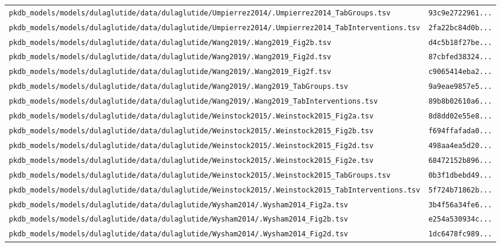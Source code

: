 \begin{longtable}{ll}
\texttt{pkdb\_models/models/dulaglutide/data/dulaglutide/Umpierrez2014/.Umpierrez2014\_TabGroups.tsv} & \texttt{93c9e2722961...} \\
\texttt{pkdb\_models/models/dulaglutide/data/dulaglutide/Umpierrez2014/.Umpierrez2014\_TabInterventions.tsv} & \texttt{2fa22bc84d0b...} \\
\texttt{pkdb\_models/models/dulaglutide/data/dulaglutide/Wang2019/.Wang2019\_Fig2b.tsv} & \texttt{d4c5b18f27be...} \\
\texttt{pkdb\_models/models/dulaglutide/data/dulaglutide/Wang2019/.Wang2019\_Fig2d.tsv} & \texttt{87cbfed38324...} \\
\texttt{pkdb\_models/models/dulaglutide/data/dulaglutide/Wang2019/.Wang2019\_Fig2f.tsv} & \texttt{c9065414eba2...} \\
\texttt{pkdb\_models/models/dulaglutide/data/dulaglutide/Wang2019/.Wang2019\_TabGroups.tsv} & \texttt{9a9eae9857e5...} \\
\texttt{pkdb\_models/models/dulaglutide/data/dulaglutide/Wang2019/.Wang2019\_TabInterventions.tsv} & \texttt{89b8b02610a6...} \\
\texttt{pkdb\_models/models/dulaglutide/data/dulaglutide/Weinstock2015/.Weinstock2015\_Fig2a.tsv} & \texttt{8d8dd02e55e8...} \\
\texttt{pkdb\_models/models/dulaglutide/data/dulaglutide/Weinstock2015/.Weinstock2015\_Fig2b.tsv} & \texttt{f694ffafada0...} \\
\texttt{pkdb\_models/models/dulaglutide/data/dulaglutide/Weinstock2015/.Weinstock2015\_Fig2d.tsv} & \texttt{498aa4ea5d20...} \\
\texttt{pkdb\_models/models/dulaglutide/data/dulaglutide/Weinstock2015/.Weinstock2015\_Fig2e.tsv} & \texttt{68472152b896...} \\
\texttt{pkdb\_models/models/dulaglutide/data/dulaglutide/Weinstock2015/.Weinstock2015\_TabGroups.tsv} & \texttt{0b3f1dbebd49...} \\
\texttt{pkdb\_models/models/dulaglutide/data/dulaglutide/Weinstock2015/.Weinstock2015\_TabInterventions.tsv} & \texttt{5f724b71862b...} \\
\texttt{pkdb\_models/models/dulaglutide/data/dulaglutide/Wysham2014/.Wysham2014\_Fig2a.tsv} & \texttt{3b4f56a34fe6...} \\
\texttt{pkdb\_models/models/dulaglutide/data/dulaglutide/Wysham2014/.Wysham2014\_Fig2b.tsv} & \texttt{e254a530934c...} \\
\texttt{pkdb\_models/models/dulaglutide/data/dulaglutide/Wysham2014/.Wysham2014\_Fig2d.tsv} & \texttt{1dc6478fc989...} \\

\end{longtable}
